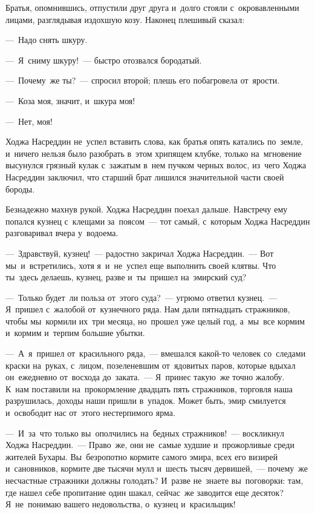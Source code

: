\documentclass[12pt,a4paper]{book}
\begin{document}
Братья, опомнившись, отпустили друг друга и~долго стояли с~окровавленными лицами, разглядывая издохшую козу. Наконец плешивый сказал:

—~Надо снять шкуру.

—~Я~сниму шкуру!~— быстро отозвался бородатый.

—~Почему~же ты?~— спросил второй; плешь его побагровела от~ярости.

—~Коза моя, значит, и~шкура моя!

—~Нет, моя!

Ходжа Насреддин не~успел вставить слова, как братья опять катались по~земле, и~ничего нельзя было разобрать в~этом хрипящем клубке, только на~мгновение высунулся грязный кулак с~зажатым в~нем пучком черных волос, из~чего Ходжа Насреддин заключил, что старший брат лишился значительной части своей бороды.

Безнадежно махнув рукой. Ходжа Насреддин поехал дальше. Навстречу ему попался кузнец с~клещами за~поясом~— тот самый, с~которым Ходжа Насреддин разговаривал вчера у~водоема.

—~Здравствуй, кузнец!~— радостно закричал Ходжа Насреддин.~— Вот мы~и~встретились, хотя я~и~не~успел еще выполнить своей клятвы. Что ты~здесь делаешь, кузнец, разве и~ты~пришел на~эмирский суд?

—~Только будет~ли польза от~этого суда?~— угрюмо ответил кузнец.~— Я~пришел с~жалобой от~кузнечного ряда. Нам дали пятнадцать стражников, чтобы мы~кормили их~три месяца, но~прошел уже целый год, а~мы~все кормим и~кормим и~терпим большие убытки.

—~А~я~пришел от~красильного ряда,~— вмешался какой-то человек со~следами краски на~руках, с~лицом, позеленевшим от~ядовитых паров, которые вдыхал он~ежедневно от~восхода до~заката.~— Я~принес такую~же точно жалобу. К~нам поставили на~прокормление двадцать пять стражников, торговля наша разрушилась, доходы наши пришли в~упадок. Может быть, эмир смилуется и~освободит нас от~этого нестерпимого ярма.

—~И~за~что только вы~ополчились на~бедных стражников!~— воскликнул Ходжа Насреддин.~— Право~же, они не~самые худшие и~прожорливые среди жителей Бухары. Вы~безропотно кормите самого эмира, всех его визирей и~сановников, кормите две тысячи мулл и~шесть тысяч дервишей,~— почему~же несчастные стражники должны голодать? И~разве не~знаете вы~поговорки: там, где нашел себе пропитание один шакал, сейчас~же заводится еще десяток? Я~не~понимаю вашего недовольства, о~кузнец и~красильщик!
\end{document}
